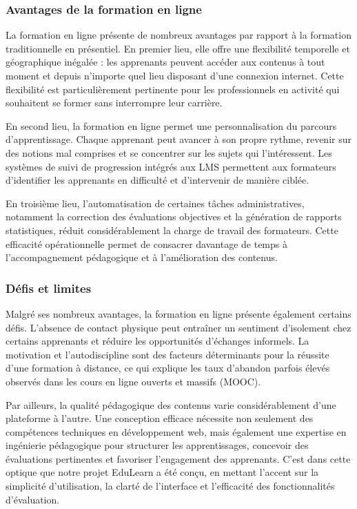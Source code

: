 \documentclass[12pt,a4paper]{report}
\begin{document}
\subsubsection*{Avantages de la formation en ligne}
La formation en ligne présente de nombreux avantages par rapport à la formation traditionnelle en présentiel. En premier lieu, elle offre une flexibilité temporelle et géographique inégalée : les apprenants peuvent accéder aux contenus à tout moment et depuis n'importe quel lieu disposant d'une connexion internet. Cette flexibilité est particulièrement pertinente pour les professionnels en activité qui souhaitent se former sans interrompre leur carrière.

En second lieu, la formation en ligne permet une personnalisation du parcours d'apprentissage. Chaque apprenant peut avancer à son propre rythme, revenir sur des notions mal comprises et se concentrer sur les sujets qui l'intéressent. Les systèmes de suivi de progression intégrés aux LMS permettent aux formateurs d'identifier les apprenants en difficulté et d'intervenir de manière ciblée.

En troisième lieu, l'automatisation de certaines tâches administratives, notamment la correction des évaluations objectives et la génération de rapports statistiques, réduit considérablement la charge de travail des formateurs. Cette efficacité opérationnelle permet de consacrer davantage de temps à l'accompagnement pédagogique et à l'amélioration des contenus.

\subsubsection*{Défis et limites}
Malgré ses nombreux avantages, la formation en ligne présente également certains défis. L'absence de contact physique peut entraîner un sentiment d'isolement chez certains apprenants et réduire les opportunités d'échanges informels. La motivation et l'autodiscipline sont des facteurs déterminants pour la réussite d'une formation à distance, ce qui explique les taux d'abandon parfois élevés observés dans les cours en ligne ouverts et massifs (MOOC).

Par ailleurs, la qualité pédagogique des contenus varie considérablement d'une plateforme à l'autre. Une conception efficace nécessite non seulement des compétences techniques en développement web, mais également une expertise en ingénierie pédagogique pour structurer les apprentissages, concevoir des évaluations pertinentes et favoriser l'engagement des apprenants. C'est dans cette optique que notre projet EduLearn a été conçu, en mettant l'accent sur la simplicité d'utilisation, la clarté de l'interface et l'efficacité des fonctionnalités d'évaluation.
\end{document}
